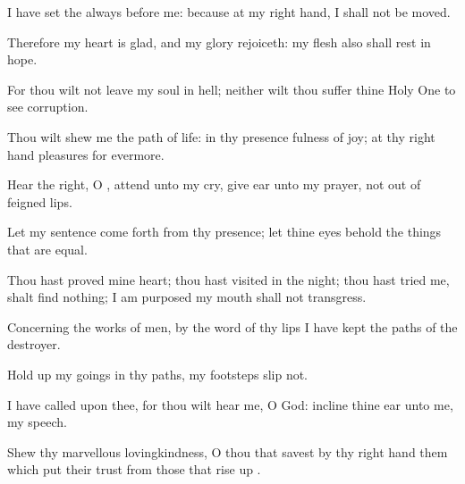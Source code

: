 {\Q {}I have
set the
{}
always before me: because
{} at my right
hand, I shall not be
moved.


\par }{\Q {}Therefore my
heart is
glad, and my
glory
rejoiceth: my
flesh also shall
rest in
hope.


\par }{\Q {}For thou wilt not
leave my
soul in
hell; neither wilt thou
suffer thine Holy
One to
see
corruption.


\par }{\Q {}Thou wilt
shew me the
path of
life: in thy
presence
{}
fulness of
joy; at thy right
hand
{}
pleasures for
evermore.




\par }
{\Q {}Hear the
right, O
{},
attend unto my
cry, give
ear unto my
prayer,
{}
not out of
feigned
lips.


\par }{\Q {}Let my
sentence come
forth from thy
presence; let thine
eyes
behold the things that are
equal.


\par }{\Q {}Thou hast
proved mine
heart; thou hast
visited
{} in the
night; thou hast
tried me,
{} shalt
find nothing; I am
purposed
{} my
mouth shall not
transgress.


\par }{\Q {}Concerning the
works of
men, by the
word of thy
lips I have
kept
{} the
paths of the
destroyer.


\par }{\Q {}Hold
up my
goings in thy
paths,
{} my
footsteps
slip not.


\par }{\Q {}I have
called upon thee, for thou wilt
hear me, O
God:
incline thine
ear unto me,
{} my
speech.


\par }{\Q {}Shew thy
marvellous
lovingkindness, O thou that
savest by thy right
hand them which put their
trust
{} from those that rise
up
{}.


\par }{\BB \par }
